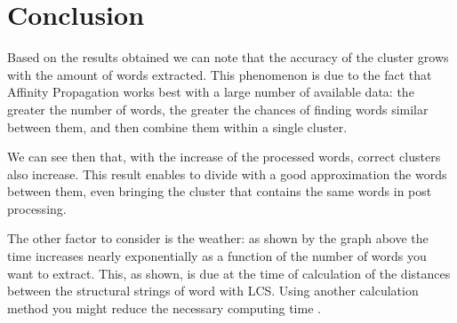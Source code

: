 \section{Conclusion}

Based on the results obtained we can note that the accuracy of the cluster grows with the amount of words extracted. This phenomenon is due to the fact that Affinity Propagation works best with a large number of available data: the greater the number of words, the greater the chances of finding words similar between them, and then combine them within a single cluster.

We can see then that, with the increase of the processed words, correct clusters also increase. This result enables to divide with a good approximation the words between them, even bringing the cluster that contains the same words in post processing.

The other factor to consider is the weather: as shown by the graph above the time increases nearly exponentially as a function of the number of words you want to extract. This, as shown, is due at the time of calculation of the distances between the structural strings of word with LCS. Using another calculation method you might reduce the necessary computing time .